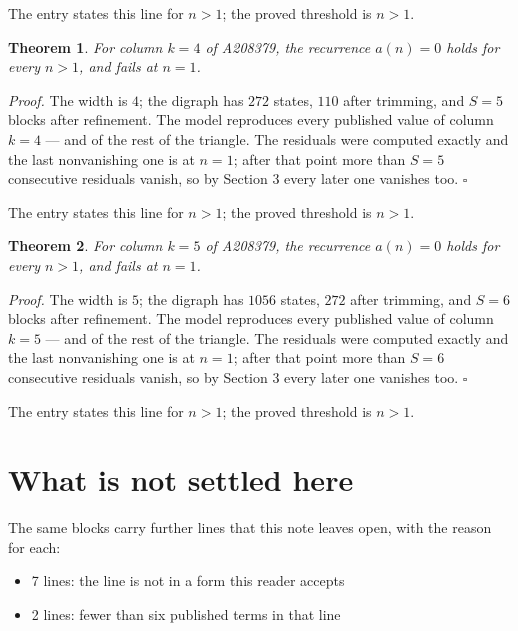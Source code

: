 \documentclass[11pt]{article}
\newtheorem{theorem}{Theorem}
\theoremstyle{definition}
\begin{document}
The entry states this line for $n > 1$; the proved threshold is $n > 1$.

\begin{theorem} For column $k = 4$ of A208379, the recurrence $a(n) = 0$ holds for every $n > 1$, and fails at $n = 1$.\end{theorem}

{\itshape Proof.} The width is $4$; the digraph has $272$ states, $110$ after trimming, and $S = 5$ blocks after refinement. The model reproduces every published value of column $k = 4$ --- and of the rest of the triangle. The residuals were computed exactly and the last nonvanishing one is at $n = 1$; after that point more than $S = 5$ consecutive residuals vanish, so by Section 3 every later one vanishes too. $\square$

The entry states this line for $n > 1$; the proved threshold is $n > 1$.

\begin{theorem} For column $k = 5$ of A208379, the recurrence $a(n) = 0$ holds for every $n > 1$, and fails at $n = 1$.\end{theorem}

{\itshape Proof.} The width is $5$; the digraph has $1056$ states, $272$ after trimming, and $S = 6$ blocks after refinement. The model reproduces every published value of column $k = 5$ --- and of the rest of the triangle. The residuals were computed exactly and the last nonvanishing one is at $n = 1$; after that point more than $S = 6$ consecutive residuals vanish, so by Section 3 every later one vanishes too. $\square$

The entry states this line for $n > 1$; the proved threshold is $n > 1$.

\section{What is not settled here}

The same blocks carry further lines that this note leaves open, with the reason for each:

\begin{itemize}

\item 7 lines: the line is not in a form this reader accepts

\item 2 lines: fewer than six published terms in that line

\end{itemize}
\end{document}
